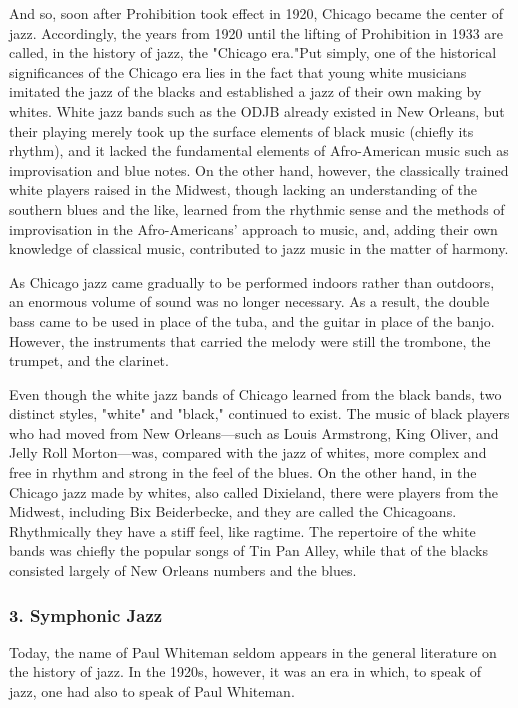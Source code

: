 And so, soon after Prohibition took effect in 1920, Chicago became the center of jazz. Accordingly, the years from 1920 until the lifting of Prohibition in 1933 are called, in the history of jazz, the "Chicago era."Put simply, one of the historical significances of the Chicago era lies in the fact that young white musicians imitated the jazz of the blacks and established a jazz of their own making by whites. White jazz bands such as the ODJB already existed in New Orleans, but their playing merely took up the surface elements of black music (chiefly its rhythm), and it lacked the fundamental elements of Afro-American music such as improvisation and blue notes. On the other hand, however, the classically trained white players raised in the Midwest, though lacking an understanding of the southern blues and the like, learned from the rhythmic sense and the methods of improvisation in the Afro-Americans' approach to music, and, adding their own knowledge of classical music, contributed to jazz music in the matter of harmony.

As Chicago jazz came gradually to be performed indoors rather than outdoors, an enormous volume of sound was no longer necessary. As a result, the double bass came to be used in place of the tuba, and the guitar in place of the banjo. However, the instruments that carried the melody were still the trombone, the trumpet, and the clarinet.

Even though the white jazz bands of Chicago learned from the black bands, two distinct styles, "white" and "black," continued to exist. The music of black players who had moved from New Orleans—such as Louis Armstrong, King Oliver, and Jelly Roll Morton—was, compared with the jazz of whites, more complex and free in rhythm and strong in the feel of the blues. On the other hand, in the Chicago jazz made by whites, also called Dixieland, there were players from the Midwest, including Bix Beiderbecke, and they are called the Chicagoans. Rhythmically they have a stiff feel, like ragtime. The repertoire of the white bands was chiefly the popular songs of Tin Pan Alley, while that of the blacks consisted largely of New Orleans numbers and the blues.

\subsubsection{3. Symphonic Jazz}

Today, the name of Paul Whiteman seldom appears in the general literature on the history of jazz. In the 1920s, however, it was an era in which, to speak of jazz, one had also to speak of Paul Whiteman.


